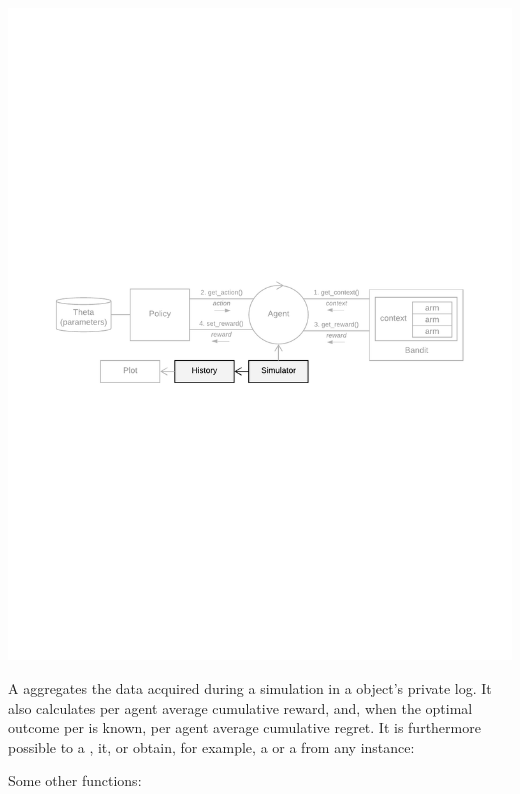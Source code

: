\documentclass{jss}
\begin{document}
\includegraphics[width=\textwidth]{fig/all_cmab_phases_Part7}

A  aggregates the data acquired during a simulation in a  object's private  log. It also calculates per agent average cumulative reward, and, when the optimal outcome per  is known, per agent average cumulative regret. It is furthermore possible to  a ,  it, or obtain, for example, a  or a  from any  instance:


Some other  functions:
\end{document}
